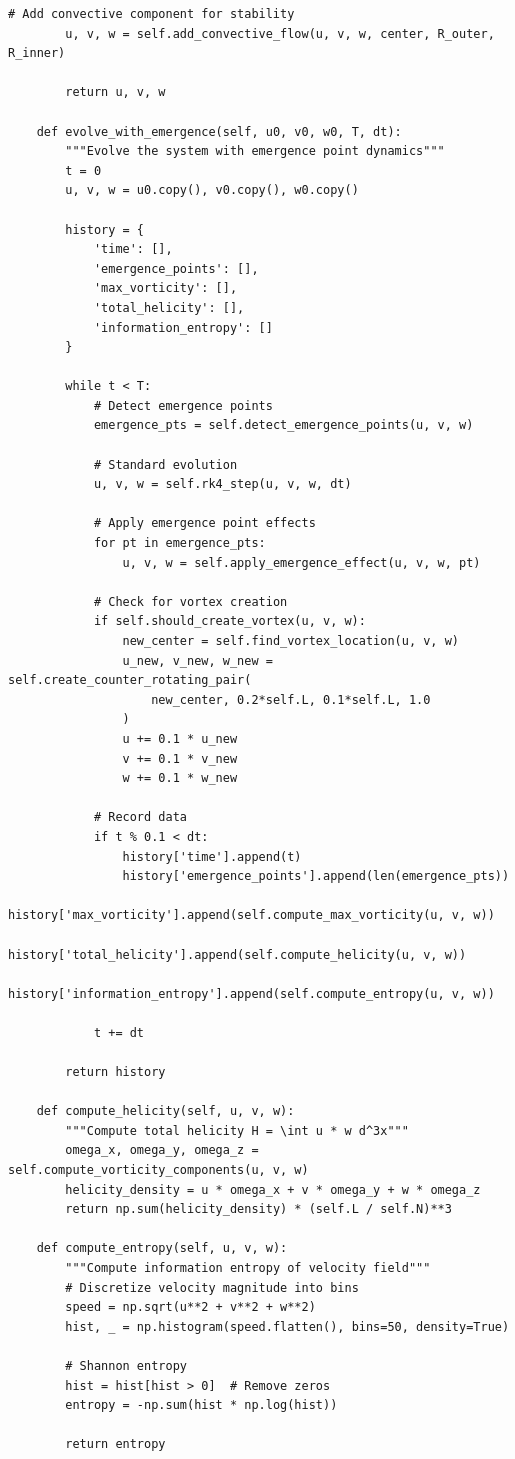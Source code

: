 \documentclass[12pt]{article}
\begin{document}
\begin{lstlisting}[caption={Vortex Dynamics Simulation Framework}]
        # Add convective component for stability
        u, v, w = self.add_convective_flow(u, v, w, center, R_outer, R_inner)
        
        return u, v, w
    
    def evolve_with_emergence(self, u0, v0, w0, T, dt):
        """Evolve the system with emergence point dynamics"""
        t = 0
        u, v, w = u0.copy(), v0.copy(), w0.copy()
        
        history = {
            'time': [],
            'emergence_points': [],
            'max_vorticity': [],
            'total_helicity': [],
            'information_entropy': []
        }
        
        while t < T:
            # Detect emergence points
            emergence_pts = self.detect_emergence_points(u, v, w)
            
            # Standard evolution
            u, v, w = self.rk4_step(u, v, w, dt)
            
            # Apply emergence point effects
            for pt in emergence_pts:
                u, v, w = self.apply_emergence_effect(u, v, w, pt)
            
            # Check for vortex creation
            if self.should_create_vortex(u, v, w):
                new_center = self.find_vortex_location(u, v, w)
                u_new, v_new, w_new = self.create_counter_rotating_pair(
                    new_center, 0.2*self.L, 0.1*self.L, 1.0
                )
                u += 0.1 * u_new
                v += 0.1 * v_new
                w += 0.1 * w_new
            
            # Record data
            if t % 0.1 < dt:
                history['time'].append(t)
                history['emergence_points'].append(len(emergence_pts))
                history['max_vorticity'].append(self.compute_max_vorticity(u, v, w))
                history['total_helicity'].append(self.compute_helicity(u, v, w))
                history['information_entropy'].append(self.compute_entropy(u, v, w))
            
            t += dt
        
        return history
    
    def compute_helicity(self, u, v, w):
        """Compute total helicity H = \int u * w d^3x"""
        omega_x, omega_y, omega_z = self.compute_vorticity_components(u, v, w)
        helicity_density = u * omega_x + v * omega_y + w * omega_z
        return np.sum(helicity_density) * (self.L / self.N)**3
    
    def compute_entropy(self, u, v, w):
        """Compute information entropy of velocity field"""
        # Discretize velocity magnitude into bins
        speed = np.sqrt(u**2 + v**2 + w**2)
        hist, _ = np.histogram(speed.flatten(), bins=50, density=True)
        
        # Shannon entropy
        hist = hist[hist > 0]  # Remove zeros
        entropy = -np.sum(hist * np.log(hist))
        
        return entropy
\end{lstlisting}
\end{document}
